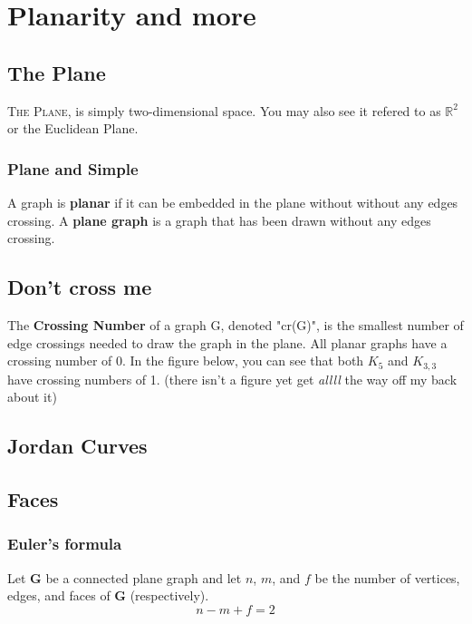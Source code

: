 \chapter{Planarity and more}
\section{The Plane}
\lettrine[lines=4]{T}{he Plane}, is simply two-dimensional space. You may also see it refered to as $\mathbb{R}^2$ or the Euclidean Plane.\newline
\subsection{Plane and Simple}
A graph is \textbf{planar} if it can be embedded in the plane without without any edges crossing.\newline
A \textbf{plane graph} is a graph that has been drawn without any edges crossing.\newline
\begin{figure}[!ht]
	\centering
\end{figure}

\section{Don't cross me}
The \textbf{Crossing Number} of a graph G, denoted "cr(G)", is the smallest number of edge crossings needed to draw the graph in the plane.\newline
All planar graphs have a crossing number of 0. In the figure below, you can see that both $K_5$ and $K_{3,3}$ have crossing numbers of 1. (there isn't a figure yet get \textit{allll} the way off my back about it)

\section{Jordan Curves}
\section{Faces}
\subsection{Euler's formula}
Let \textbf{G} be a connected plane graph and let $n$, $m$, and $f$ be the number of vertices, edges, and faces of \textbf{G} (respectively).
\begin{equation*}
	n-m+f=2
\end{equation*}
